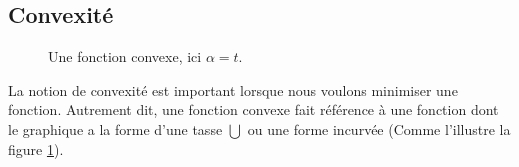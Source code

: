 		\subsection{Convexité} \label{subsec:convex}
		\begin{figure}
			\caption[Illustration d'une fonction convexe]{Une fonction convexe, ici $\alpha=t$. }
			\label{fig:convexe_graph}
		\end{figure}
		La notion de convexité est important lorsque nous voulons minimiser une fonction.
		Autrement dit, une fonction convexe fait référence à une fonction dont le graphique a la forme d'une tasse $\bigcup$ ou une forme incurvée (Comme l'illustre la figure \ref{fig:convexe_graph}).
		
